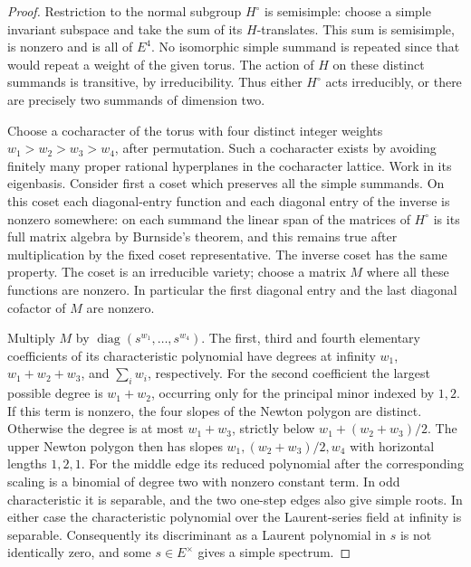 \begin{proof}
Restriction to the normal subgroup $H^\circ$ is semisimple:
choose a simple invariant subspace and take the sum of its
$H$-translates. This sum is semisimple, is nonzero and is all
of $E^4$. No isomorphic simple summand is repeated since that
would repeat a weight of the given torus. The action of $H$
on these distinct summands is transitive, by irreducibility.
Thus either $H^\circ$ acts irreducibly, or there are precisely
two summands of dimension two.

Choose a cocharacter of the torus with four distinct integer
weights $w_1>w_2>w_3>w_4$, after permutation. Such a
cocharacter exists by avoiding finitely many proper rational
hyperplanes in the cocharacter lattice. Work in its eigenbasis.
Consider first a coset which preserves all the simple summands.
On this coset each diagonal-entry function and each diagonal
entry of the inverse is nonzero somewhere: on each summand
the linear span of the matrices of $H^\circ$ is its full
matrix algebra by Burnside's theorem, and this remains true
after multiplication by the fixed coset representative.
The inverse coset has the same property. The coset is an
irreducible variety; choose a matrix $M$ where all these
functions are nonzero. In particular the first diagonal entry
and the last diagonal cofactor of $M$ are nonzero.

Multiply $M$ by $\operatorname{diag}(s^{w_1},\ldots,s^{w_4})$.
The first, third and fourth elementary coefficients of its
characteristic polynomial have degrees at infinity
$w_1$, $w_1+w_2+w_3$, and $\sum_i w_i$, respectively.
For the second coefficient the largest possible degree is
$w_1+w_2$, occurring only for the principal minor indexed
by $1,2$. If this term is nonzero, the four slopes of the
Newton polygon are distinct. Otherwise the degree is at most
$w_1+w_3$, strictly below
$w_1+(w_2+w_3)/2$. The upper Newton polygon then has slopes
$w_1,(w_2+w_3)/2,w_4$ with horizontal lengths $1,2,1$.
For the middle edge its reduced polynomial after the
corresponding scaling is a binomial of degree two with
nonzero constant term. In odd characteristic it is
separable, and the two one-step edges also give simple
roots. In either case the characteristic polynomial over
the Laurent-series field at infinity is separable.
Consequently its discriminant as a Laurent polynomial in
$s$ is not identically zero, and some $s\in E^\times$ gives
a simple spectrum.


\end{proof}
